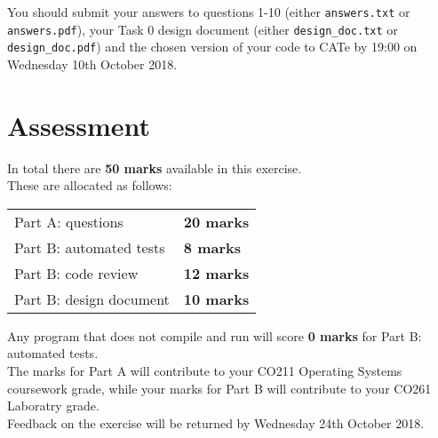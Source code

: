 \documentclass[a4paper,12pt]{article}
\newcommand{\shell}[1]{\lstinline!#1!}
\begin{document}
You should submit your answers to questions 1-10 (either \shell{answers.txt} or \shell{answers.pdf}), your Task 0 design document (either \shell{design_doc.txt} or \shell{design_doc.pdf}) and the chosen version of your code to CATe by 19:00 on Wednesday 10th October 2018.\\


\section*{Assessment}
In total there are {\bf 50 marks} available in this exercise.\\
These are allocated as follows:
%
\begin{center}
\begin{tabular}{l@{\qquad\qquad}l}
  Part A: questions       & {\bf 20 marks} \\
  Part B: automated tests & {\bf 8 marks} \\
  Part B: code review     & {\bf 12 marks} \\
  Part B: design document & {\bf 10 marks} \\    
\end{tabular}
\end{center}
%
Any program that does not compile and run will score {\bf 0 marks} for Part B: automated tests.\\[-0.8em]

\noindent The marks for Part A will contribute to your CO211 Operating Systems coursework grade,
while your marks for Part B will contribute to your CO261 Laboratry grade.\\[-0.8em]


\noindent Feedback on the exercise will be returned by Wednesday 24th October 2018.


\end{document}

